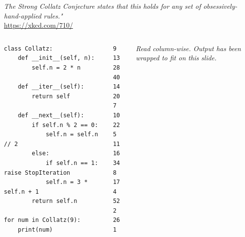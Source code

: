 \begin{frame}
\begin{columns}[T]
\footnotesize
\emph{The Strong Collatz Conjecture states that this holds for any set of obsessively-hand-applied rules."}\\
\url{https://xkcd.com/710/}
\end{columns}
%
\end{frame}


\begin{frame}[fragile]
%
\vspace{-9pt}
\begin{columns}[T]
\begin{codebox}
\begin{verbatim}
class Collatz:
    def __init__(self, n):
        self.n = 2 * n

    def __iter__(self):
        return self

    def __next__(self):
        if self.n % 2 == 0:
            self.n = self.n // 2
        else:
            if self.n == 1: raise StopIteration
            self.n = 3 * self.n + 1
        return self.n

for num in Collatz(9):
    print(num)
\end{verbatim}
\end{codebox}
%
\begin{cmdbox}[Output]
\begin{verbatim}
9   13
28  40
14  20
7   10
22  5
11  16
34  8
17  4
52  2
26  1
\end{verbatim}
\end{cmdbox}
%
\footnotesize
\emph{Read column-wise. Output has been wrapped to fit on this slide.}
\end{columns}
%
\end{frame}


